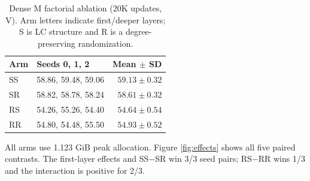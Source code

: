 \begin{table}[!htb]
\centering
\caption{Dense M factorial ablation (20K updates, V). Arm letters indicate first/deeper layers; S is LC structure and R is a degree-preserving randomization.}
\label{tab:factorial}
\tabfont
\setlength{\tabcolsep}{4pt}
\begin{tabular}{@{}llr@{}}
\toprule
Arm & Seeds 0, 1, 2 & Mean $\pm$ SD \\
\midrule
SS & 58.86, 59.48, 59.06 & $59.13\pm0.32$ \\
SR & 58.82, 58.78, 58.24 & $58.61\pm0.32$ \\
RS & 54.26, 55.26, 54.40 & $54.64\pm0.54$ \\
RR & 54.80, 54.48, 55.50 & $54.93\pm0.52$ \\
\bottomrule
\end{tabular}
\par\smallskip
\begin{minipage}{\columnwidth}\normalsize All arms use 1.123 GiB peak allocation. Figure \ref{fig:effects} shows all five paired contrasts. The first-layer effects and SS$-$SR win 3/3 seed pairs; RS$-$RR wins 1/3 and the interaction is positive for 2/3.\end{minipage}
\end{table}
